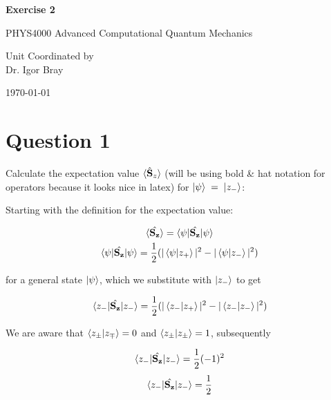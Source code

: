 \documentclass{article}
\let\oldhat\hat
\renewcommand{\hat}[1]{\oldhat{\mathbf{#1}}}
\begin{document}
\newpage
\begin{center}
       
       \vspace*{1cm}
        \LARGE
       \textbf{Exercise 2}

       \vspace{0.5cm}
        PHYS4000
        Advanced Computational Quantum Mechanics
            
       \vspace{1.5cm}

       \bigskip

       Unit Coordinated by\\
       Dr. Igor Bray
            
       \vspace{0.8cm}
     
            
       
        \today
            
\end{center}
\newpage


\section{Question 1}

    Calculate the expectation value $\braket{\hat{S}_z}$ (will be using bold \& hat notation for operators because
    it looks nice in latex) for $\ket{\psi}\;=\;\ket{z_-}$:
    \medskip

    Starting with the definition for the expectation value:

    \begin{gather}
        \braket{\hat{S_z}} = \braket{\psi|\hat{S_z}|\psi}\\
        \braket{\psi|\hat{S_z}|\psi} = \frac{1}{2}(|\braket{\psi|z_+}|^2 - |\braket{\psi|z_-}|^2)
    \end{gather}

    for a general state $\ket{\psi}$, which we substitute with $\ket{z_-}$ to get

    \begin{gather}
        \braket{z_-|\hat{S_z}|z_-} = \frac{1}{2}(|\braket{z_-|z_+}|^2 - |\braket{z_-|z_-}|^2)
    \end{gather}

    We are aware that $\braket{z_{\pm}|z_{\mp}} = 0$ and  $\braket{z_{\pm}|z_{\pm}} = 1$, subsequently

    \begin{gather*}
        \braket{z_-|\hat{S_z}|z_-} = \frac{1}{2}(-1)^2
    \end{gather*}
    \begin{gather}
        \braket{z_-|\hat{S_z}|z_-} = \frac{1}{2}
    \end{gather}
\end{document}
